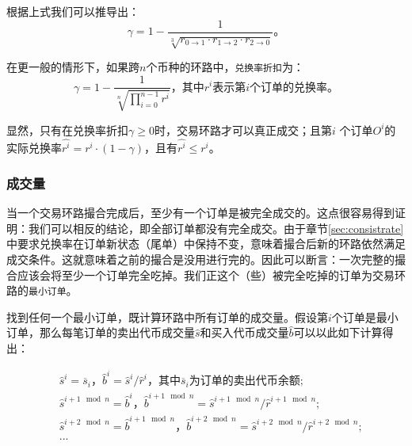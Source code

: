 \documentclass[UTF8,nofonts]{ctexart}
\begin{document}
根据上式我们可以推导出：
\begin{equation*}
\gamma = 1- \frac{1}{\sqrt[3]{r_{0\rightarrow 1} \cdot r_{1\rightarrow 2} \cdot r_{2\rightarrow 0}}}\text{。}
\end{equation*}

在更一般的情形下，如果跨$n$个币种的环路中，\texttt{兑换率折扣}为：
\begin{equation*}
\gamma = 1- \frac{1}{\sqrt[n]{\prod_{i=0}^{n-1} r^i}} \text{，其中} r^i \text{表示第}i\text{个订单的兑换率。}
\end{equation*}

显然，只有在兑换率折扣$\gamma \ge 0$时，交易环路才可以真正成交；且第$i$ 个订单$O^i$的实际兑换率$\hat{r^i} = r^i \cdot (1-\gamma)$，且有$\hat{r^i}\le r^i$。



\subsubsection{成交量\label{sec:matchquantity}}

当一个交易环路撮合完成后，至少有一个订单是被完全成交的。这点很容易得到证明：我们可以相反的结论，即全部订单都没有完全成交。由于章节\ref{sec:consistrate}中要求兑换率在订单新状态（尾单）中保持不变，意味着撮合后新的环路依然满足成交条件。这就意味着之前的撮合是没用进行完的。因此可以断言：一次完整的撮合应该会将至少一个订单完全吃掉。我们正这个（些）被完全吃掉的订单为交易环路的\texttt{最小订单}。

找到任何一个最小订单，既计算环路中所有订单的成交量。假设第$i$个订单是最小订单，那么每笔订单的卖出代币成交量$\hat{s}$和买入代币成交量$\hat{b}$可以以此如下计算得出：

\[
\begin{split}
&\hat{s}^{i}=\overline{s}_i\text{，} \hat{b}^{i}=\hat{s}^{i}/\hat{r}^i \text{，其中}\overline{s}_i\text{为订单的卖出代币余额;}\\
&\hat{s}^{i+1\mod n}=\hat{b}^i\text{，} \hat{b}^{i+1\mod n}=\hat{s}^{i+1\mod n}/\hat{r}^{i+1\mod n}\text{;}\\
&\hat{s}^{i+2\mod n}=\hat{b}^{i+1\mod n}\text{，} \hat{b}^{i+2\mod n}=\hat{s}^{i+2\mod n}/\hat{r}^{i+2\mod n}\text{;}\\
& ...
\end{split}
\]
\end{document}
